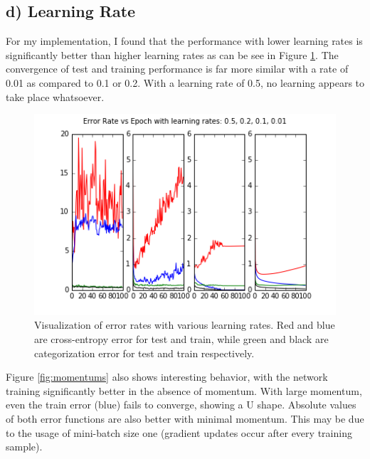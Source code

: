 \documentclass{article}
\begin{document}
\subsection{d) Learning Rate}

For my implementation, I found that the performance with lower learning rates is significantly better than higher learning rates as can be see in Figure \ref{fig:learnrates}.  The convergence of test and training performance is far more similar with a rate of 0.01 as compared to 0.1 or 0.2.  With a learning rate of 0.5, no learning appears to take place whatsoever. 
\begin{figure}[h]
  \centering
  \includegraphics[scale=0.6]{../learning_rates.png} 
  \caption{Visualization of error rates with various learning rates. Red and blue are cross-entropy error for test and train, while green and black are categorization error for test and train respectively. }
  \label{fig:learnrates}
\end{figure}

Figure \ref{fig:momentums} also shows interesting behavior, with the network training significantly better in the absence of momentum. With large momentum, even the train error (blue) fails to converge, showing a U shape. Absolute values of both error functions are also better with minimal momentum. This may be due to the usage of mini-batch size one (gradient updates occur after every training sample). 
\end{document}
